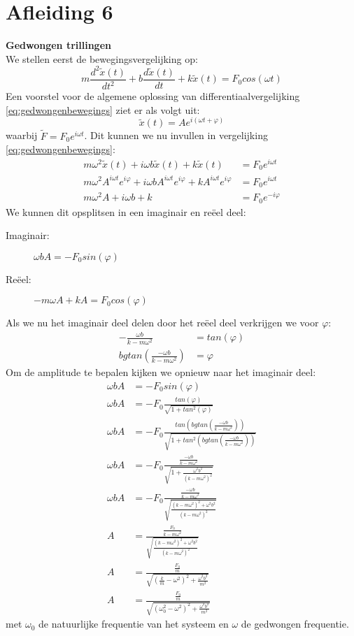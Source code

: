 \documentclass[a4paper,kul]{kulakarticle} %
\begin{document}
\section{Afleiding 6}
\textbf{Gedwongen trillingen}\\
We stellen eerst de bewegingsvergelijking op:
\begin{equation}
	m\frac{d^2\widetilde{x}(t)}{dt^2}+b\frac{d\widetilde{x}(t)}{dt}+k\widetilde{x}(t) = F_0cos(\omega t)
	\label{eq:gedwongenbewegings}
\end{equation}
Een voorstel voor de algemene oplossing van differentiaalvergelijking \ref{eq:gedwongenbewegings} ziet er als volgt uit:
\begin{equation*}
	\widetilde{x}(t) = Ae^{i(\omega t +\varphi)}
\end{equation*}
waarbij $\widetilde{F} = F_0e^{i\omega t}$.
Dit kunnen we nu invullen in vergelijking \ref{eq:gedwongenbewegings}:
\begin{align*}
	m\omega^2\widetilde{x}(t)+i\omega b\widetilde{x}(t)+k\widetilde{x}(t) & =F_0e^{i\omega t}\\
	m\omega^2A^{i\omega t}e^{i\varphi}+i\omega bA^{i\omega t}e^{i\varphi}+kA^{i\omega t}e^{i\varphi} & =F_0e^{i\omega t}\\
	m\omega^2A+i\omega b+k & =F_0e^{-i\varphi} 
\end{align*}
We kunnen dit opsplitsen in een imaginair en reëel deel:
\begin{description}
	\item[Imaginair:]$\omega bA = -F_0sin(\varphi)$
	\item[Reëel:] $-m\omega A +kA = F_0cos(\varphi)$
\end{description}
Als we nu het imaginair deel delen door het reëel deel verkrijgen we voor $\varphi$:
\begin{align*}
	-\frac{\omega b}{k-m\omega^2} &= tan(\varphi)\\
	bgtan(\frac{-\omega b}{k-m\omega^2}) & =\varphi
\end{align*}
Om de amplitude te bepalen kijken we opnieuw naar het imaginair deel:
\begin{align*}
	\omega bA &= -F_0sin(\varphi)\\
	\omega bA &= -F_0\frac{tan(\varphi)}{\sqrt{1+tan^2(\varphi)}}\\
	\omega bA &= -F_0\frac{tan(bgtan(\frac{-\omega b}{k-m\omega^2}))}{\sqrt{1+tan^2(bgtan(\frac{-\omega b}{k-m\omega^2}))}}\\
	\omega bA &= -F_0\frac{\frac{-\omega b}{k-m\omega^2}}{\sqrt{1+\frac{\omega^2 b^2}{(k-m\omega^2)^2}}}\\
	\omega bA &= -F_0\frac{\frac{-\omega b}{k-m\omega^2}}{\sqrt{\frac{(k-m\omega^2)^2+\omega^2 b^2}{(k-m\omega^2)^2}}}\\
	A &= \frac{\frac{F_0}{k-m\omega^2}}{\sqrt{\frac{(k-m\omega^2)^2+\omega^2 b^2}{(k-m\omega^2)^2}}}\\
	A &= \frac{\frac{F_0}{m}}{\sqrt{(\frac{k}{m}-\omega^2)^2+\frac{\omega^2b^2}{m^2}}}\\
	A &= \frac{\frac{F_0}{m}}{\sqrt{(\omega_0^2-\omega^2)^2+\frac{\omega^2b^2}{m^2}}}	
\end{align*}
met $\omega_0$ de natuurlijke frequentie van het systeem en $\omega$ de gedwongen frequentie.
\newpage
\end{document}
